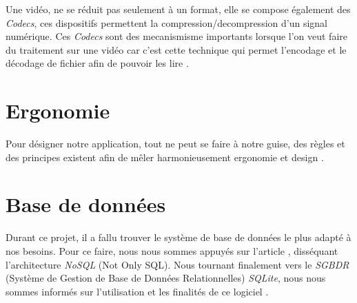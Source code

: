 Une vidéo, ne se réduit pas seulement à un format, elle se compose également des \textit{Codecs}, ces dispositifs permettent la compression/decompression d'un signal numérique. Ces \textit{Codecs} sont des mecanismisme importants lorsque l'on veut faire du traitement sur une vidéo car c'est cette technique qui permet l'encodage et le décodage de fichier afin de pouvoir les lire \cite{ghanbari1999video} \cite{he2013introduction}.
\section{Ergonomie}
Pour désigner notre application, tout ne peut se faire à notre guise, des règles et des principes existent afin de mêler harmonieusement ergonomie et design \cite{lente2014scenariser}.

\section{Base de données}

Durant ce projet, il a fallu trouver le système de base de données le plus adapté à nos besoins. Pour ce faire, nous nous sommes appuyés sur l'article \cite{strauchnosql}, disséquant l'architecture \textit{NoSQL} (Not Only SQL).
Nous tournant finalement vers le \textit{SGBDR} (Système de Gestion de Base de Données Relationnelles) \textit{SQLite}, nous nous sommes informés sur l'utilisation et les finalités de ce logiciel \cite{kreibich2010using}.

